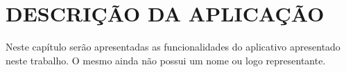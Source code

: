 
\chapter{DESCRIÇÃO DA APLICAÇÃO}

Neste capítulo serão apresentadas as funcionalidades do aplicativo apresentado neste trabalho. O mesmo ainda não possui um nome ou logo representante.